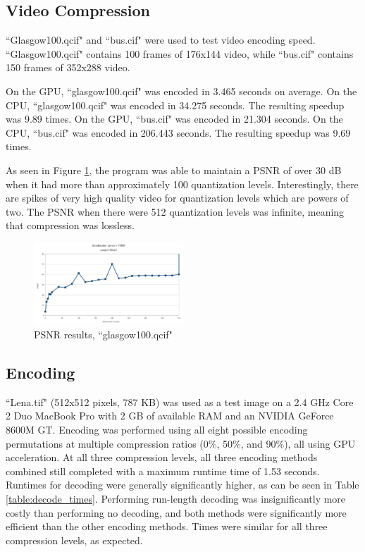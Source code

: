 \documentclass[10pt,twocolumn,twoside]{IEEEtran}
\begin{document}
\subsection{Video Compression}
``Glasgow100.qcif" and ``bus.cif" were used to test video encoding speed. ``Glasgow100.qcif" contains 100 frames of 176x144 video, while ``bus.cif" contains 150 frames of 352x288 video.

On the GPU, ``glasgow100.qcif" was encoded in 3.465 seconds on average. On the CPU, ``glasgow100.qcif" was encoded in 34.275 seconds. The resulting speedup was 9.89 times. On the GPU, ``bus.cif" was encoded in 21.304 seconds. On the CPU, ``bus.cif" was encoded in 206.443 seconds. The resulting speedup was 9.69 times.

As seen in Figure \ref{fig:glasgow_psnr}, the program was able to maintain a PSNR of over 30 dB when it had more than approximately 100 quantization levels. Interestingly, there are spikes of very high quality video for quantization levels which are powers of two. The PSNR when there were 512 quantization levels was infinite, meaning that compression was lossless.

\begin{figure}[htbp]
\begin{center}
\includegraphics[width=0.5\textwidth]{Images/glasgow100_psnr.jpg}
\caption{PSNR results, ``glasgow100.qcif"}
\label{fig:glasgow_psnr}
\end{center}
\end{figure}

\subsection{Encoding}
``Lena.tif" (512x512 pixels, 787 KB) was used as a test image on a 2.4 GHz Core 2 Duo MacBook Pro with 2 GB of available RAM and an NVIDIA GeForce 8600M GT. Encoding was performed using all eight possible encoding permutations at multiple compression ratios (0\%, 50\%, and 90\%), all using GPU acceleration. At all three compression levels, all three encoding methods combined still completed with a maximum runtime time of 1.53 seconds. Runtimes for decoding were generally significantly higher, as can be seen in Table \ref{table:decode_times}. Performing run-length decoding was insignificantly more costly than performing no decoding, and both methods were significantly more efficient than the other encoding methods. Times were similar for all three compression levels, as expected.
\end{document}
